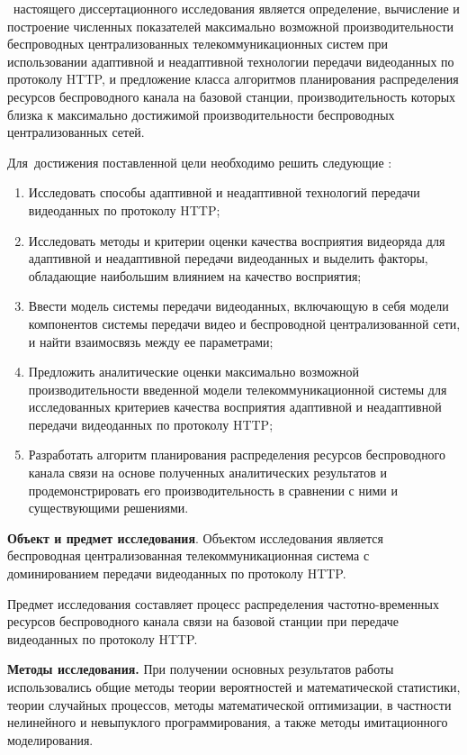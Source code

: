 \aim\ настоящего диссертационного исследования является определение, вычисление и построение численных показателей максимально возможной производительности беспроводных централизованных телекоммуникационных систем при использовании адаптивной и неадаптивной технологии передачи видеоданных по протоколу HTTP, и предложение класса алгоритмов планирования распределения ресурсов беспроводного канала на базовой станции, производительность которых близка к максимально достижимой производительности беспроводных централизованных сетей.

Для~достижения поставленной цели необходимо решить следующие {\tasks}:
\begin{enumerate}
    \item Исследовать способы адаптивной и неадаптивной технологий передачи видеоданных по протоколу HTTP;
    \item Исследовать методы и критерии оценки качества восприятия видеоряда для адаптивной и неадаптивной передачи видеоданных и выделить факторы, обладающие наибольшим влиянием на качество восприятия;
    \item Ввести модель системы передачи видеоданных, включающую в себя модели компонентов системы передачи видео и беспроводной централизованной сети, и найти взаимосвязь между ее параметрами;
    \item Предложить аналитические оценки максимально возможной производительности введенной модели телекоммуникационной системы для исследованных критериев качества восприятия адаптивной и неадаптивной передачи видеоданных по протоколу HTTP;
    \item Разработать алгоритм планирования распределения ресурсов беспроводного канала связи на основе полученных аналитических результатов и продемонстрировать его производительность в сравнении с ними и существующими решениями.
\end{enumerate}

\textbf{Объект и предмет исследования}. Объектом исследования является беспроводная централизованная телекоммуникационная система с доминированием передачи видеоданных по протоколу HTTP.

Предмет исследования составляет процесс распределения частотно-временных ресурсов беспроводного канала связи на базовой станции при передаче видеоданных по протоколу HTTP.

\textbf{Методы исследования.} При получении основных результатов работы использовались общие методы теории вероятностей и математической статистики, теории случайных процессов, методы математической оптимизации, в частности нелинейного и невыпуклого программирования, а также методы имитационного моделирования.

